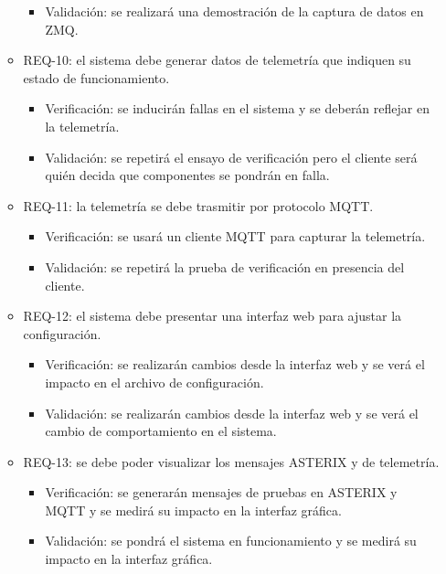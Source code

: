 \documentclass[
11pt, %
]{charter}
\begin{document}
\begin{itemize}
\begin{itemize}
\begin{itemize}
          \item Validación: se realizará una demostración de la captura de datos
            en ZMQ.
        \end{itemize}
			\item REQ-10: el sistema debe generar datos de telemetría que indiquen su estado
        de funcionamiento.
        \begin{itemize}
          \item Verificación: se inducirán fallas en el sistema y se deberán
            reflejar en la telemetría.
          \item Validación: se repetirá el ensayo de verificación pero el
            cliente será quién decida que componentes se pondrán en falla.
        \end{itemize}
			\item REQ-11: la telemetría se debe trasmitir por protocolo MQTT.
        \begin{itemize}
          \item Verificación: se usará un cliente MQTT para capturar la
            telemetría.
          \item Validación: se repetirá la prueba de verificación en presencia
            del cliente.
        \end{itemize}
			\item REQ-12: el sistema debe presentar una interfaz web para ajustar la
        configuración.
        \begin{itemize}
          \item Verificación: se realizarán cambios desde la interfaz web y se
            verá el impacto en el archivo de configuración.
          \item Validación: se realizarán cambios desde la interfaz web y se
            verá el cambio de comportamiento en el sistema.
        \end{itemize}
      \item REQ-13: se debe poder visualizar los mensajes ASTERIX y de
        telemetría.
        \begin{itemize}
          \item Verificación: se generarán mensajes de pruebas en ASTERIX y MQTT
            y se medirá su impacto en la interfaz gráfica.
          \item Validación: se pondrá el sistema en funcionamiento y se medirá
            su impacto en la interfaz gráfica.
        \end{itemize}
		\end{itemize}

\end{itemize}
\end{document}
